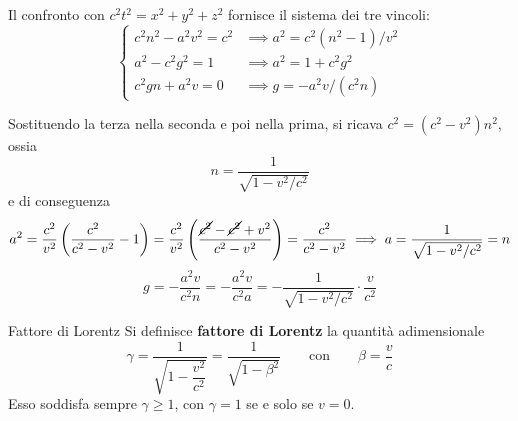 Il confronto con $c^2t^2 = x^2+y^2+z^2$ fornisce il sistema dei tre vincoli:
\begin{equation}
    \begin{cases}
        c^2 n^2 - a^2 v^2 = c^2 & \implies a^2 = c^2(n^2-1)/v^2 \\[2pt]
        a^2 - c^2 g^2 = 1 & \implies a^2 = 1 + c^2 g^2 \\[2pt]
        c^2 gn + a^2 v = 0 & \implies g = -a^2 v / (c^2 n)
    \end{cases}
\end{equation}

Sostituendo la terza nella seconda e poi nella prima, si ricava $c^2 = (c^2 - v^2)n^2$, ossia
\begin{equation}
    n = \frac{1}{\sqrt{1 - v^2/c^2}}
\end{equation}
e di conseguenza
\begin{equation}
    a^2 = \frac{c^2}{v^2}\left(\frac{c^2}{c^2-v^2} - 1\right)
        = \frac{c^2}{v^2}\left(\frac{\cancel{c^2} - \cancel{c^2} + v^2}{c^2-v^2}\right)
        = \frac{c^2}{c^2-v^2}
    \implies a = \frac{1}{\sqrt{1-v^2/c^2}} = n
\end{equation}
\begin{equation}
    g = -\frac{a^2 v}{c^2 n} = -\frac{a^2 v}{c^2 a} = -\frac{1}{\sqrt{1-v^2/c^2}} \cdot \frac{v}{c^2}
\end{equation}

\begin{definizione}{Fattore di Lorentz}
Si definisce \textbf{fattore di Lorentz} la quantità adimensionale
\begin{equation}
    \gamma = \frac{1}{\sqrt{1 - \dfrac{v^2}{c^2}}} = \frac{1}{\sqrt{1-\beta^2}}
    \qquad \text{con} \qquad \beta = \frac{v}{c}
\end{equation}
Esso soddisfa sempre $\gamma \geq 1$, con $\gamma = 1$ se e solo se $v = 0$.
\end{definizione}

